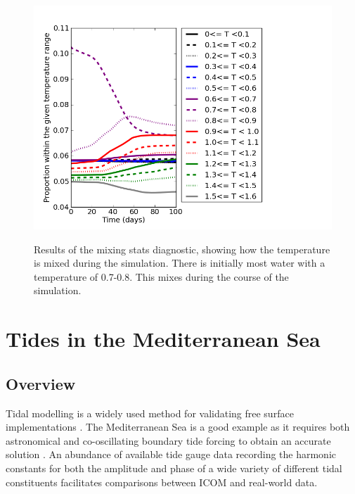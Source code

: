 \begin{figure}[h!]
\begin{center}
{\includegraphics[width=12cm]{examples_images/restratification_after_oodc/mixing_stats.png}}
\caption{Results of the mixing stats diagnostic, showing how the temperature is mixed during the simulation. There is initially most water with a temperature of 0.7-0.8. This mixes during the course of the simulation.}
\label{fig:rousset-mixing}
\end{center}
\end{figure}





\section{Tides in the Mediterranean Sea}
\label{sec:tides_in_the_med}

\subsection{Overview}

Tidal modelling is a widely used method for validating free surface implementations \citep{Shum1997}. The Mediterranean Sea
is a good example as it requires both astronomical and co-oscillating boundary tide forcing to obtain
an accurate solution \citep{Tsimplis1995, Wells2008}. An abundance of available tide gauge data recording the 
harmonic constants for both the amplitude and phase of a wide variety of different tidal constituents
facilitates comparisons between ICOM and real-world data. 
 

